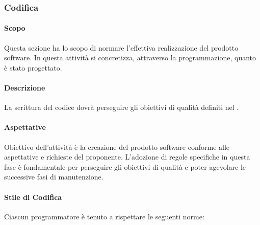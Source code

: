 \subsubsection{Codifica} \label{_codifica}
\paragraph{Scopo}
Questa sezione ha lo scopo di normare l'effettiva realizzazione del prodotto software. In questa attività si concretizza, attraverso la programmazione, quanto è stato progettato.

\paragraph{Descrizione}
La scrittura del codice dovrà perseguire gli obiettivi di qualità definiti nel .

\paragraph{Aspettative}
Obiettivo dell'attività è la creazione del prodotto software conforme alle aspettative e richieste del proponente.  L'adozione di regole specifiche in questa fase è fondamentale per perseguire gli obiettivi di qualità e poter agevolare le successive fasi di manutenzione.

\paragraph{Stile di Codifica}
Ciascun programmatore è tenuto a rispettare le seguenti norme:

